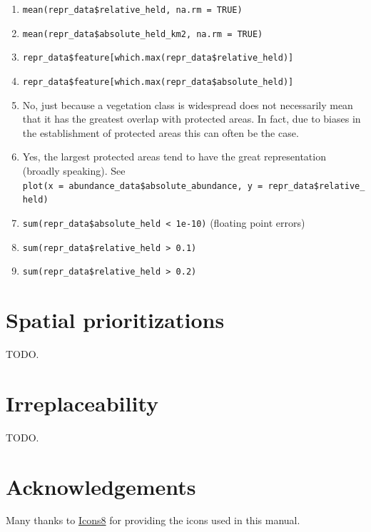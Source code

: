 \documentclass[12pt,]{book}
\providecommand{\tightlist}{%
  \setlength{\itemsep}{0pt}\setlength{\parskip}{0pt}}
\let\BeginKnitrBlock\begin \let\EndKnitrBlock\end
\begin{document}
\BeginKnitrBlock{rmdanswer}
\begin{enumerate}
\def\labelenumi{\arabic{enumi}.}
\tightlist
\item
  \texttt{mean(repr\_data\$relative\_held,\ na.rm\ =\ TRUE)}
\item
  \texttt{mean(repr\_data\$absolute\_held\_km2,\ na.rm\ =\ TRUE)}
\item
  \texttt{repr\_data\$feature{[}which.max(repr\_data\$relative\_held){]}}
\item
  \texttt{repr\_data\$feature{[}which.max(repr\_data\$absolute\_held){]}}
\item
  No, just because a vegetation class is widespread does not necessarily
  mean that it has the greatest overlap with protected areas. In fact,
  due to biases in the establishment of protected areas this can often
  be the case.
\item
  Yes, the largest protected areas tend to have the great representation
  (broadly speaking). \newline
  See
  \texttt{plot(x\ =\ abundance\_data\$absolute\_abundance,\ y\ =\ repr\_data\$relative\_held)}
\item
  \texttt{sum(repr\_data\$absolute\_held\ \textless{}\ 1e-10)} (floating
  point errors)
\item
  \texttt{sum(repr\_data\$relative\_held\ \textgreater{}\ 0.1)}
\item
  \texttt{sum(repr\_data\$relative\_held\ \textgreater{}\ 0.2)}
\end{enumerate}
\EndKnitrBlock{rmdanswer}

\chapter{Spatial prioritizations}\label{spatial-prioritizations}

TODO.

\chapter{Irreplaceability}\label{irreplaceability}

TODO.

\chapter{Acknowledgements}\label{acknowledgements}

Many thanks to \href{https://icons8.com}{Icons8} for providing the icons
used in this manual.


\end{document}
